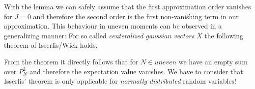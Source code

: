 

\noindent With the lemma we can safely assume that the first approximation order vanishes for $J = 0$ and therefore the second order is the first non-vanishing term in our approximation. This behaviour in uneven moments can be observed in a generalizing manner: For so called \emph{centeralized gaussian vectors} $X$ the following theorem of Isserlis/Wick holds.

From the theorem it directly follows that for $N\in\textit{uneven}$ we have an empty sum over $P_N^2$ and therefore the expectation value vanishes. We have to consider that Isserlis' theorem is only applicable for \emph{normally distributed} random variables!



\label{subsubchapter:VisualizationOneLoop}

